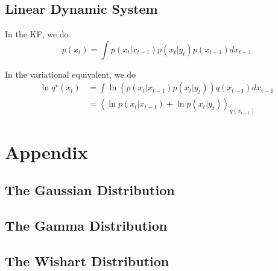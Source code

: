 \documentclass{article}
\newcommand{\<}{\langle}
\renewcommand{\>}{\rangle}
\begin{document}
\subsection{Linear Dynamic System}
\label{examples:LDS}
In the KF, we do
\begin{equation}
p(x_t) = \int p(x_t | x_{t-1}) p(x_t | y_t) p(x_{t-1}) d x_{t-1}
\end{equation}

In the variational equivalent, we do
\begin{equation}
\begin{split}
\ln q^\star(x_t) &= \int \ln \left( p(x_t | x_{t-1}) p(x_t | y_t) \right) q(x_{t-1}) d x_{t-1}\\
            &= \left<  \ln  p(x_t | x_{t-1})  + \ln p(x_t | y_t)  \right>_{q(x_{t-1})}
\end{split}
\end{equation}


\section{Appendix}
\subsection{The Gaussian Distribution}
\subsection{The Gamma Distribution}
\subsection{The Wishart Distribution}
\end{document}
